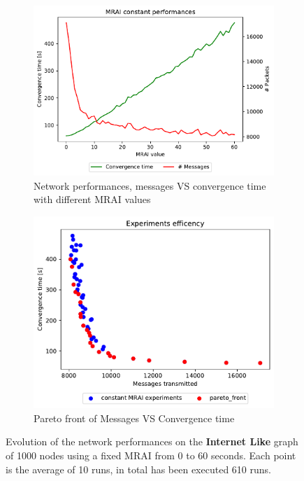 \begin{figure}[h]
     \centering
     \begin{subfigure}[b]{0.503\textwidth}
         \centering
         \includegraphics[width=\textwidth]{images/internet_like/1000/constantMRAI/internet_like-constant_mrai_evolution.pdf}
		 \caption{Network performances, messages VS convergence time with different
			\ac{MRAI} values}
         \label{fig:internet_like_1000_constant_evolution_evolution}
     \end{subfigure}
     \hfill
     \begin{subfigure}[b]{0.477\textwidth}
         \centering
         \includegraphics[width=\textwidth]{images/internet_like/1000/constantMRAI/internet_like-constant.pdf}
		 \caption{Pareto front of Messages VS Convergence time}
         \label{fig:internet_like_1000_constant_evolution_paretoFront}
     \end{subfigure}
		\caption{Evolution of the network performances on the \textbf{Internet Like} graph
			of \num{1000} nodes using a fixed \ac{MRAI} from \num{0} to \num{60} seconds.
			Each point is the average of \num{10} runs, in total has been executed
			\num{610} runs.}
        \label{fig:internet_like_1000_constant_evolution}
\end{figure}

